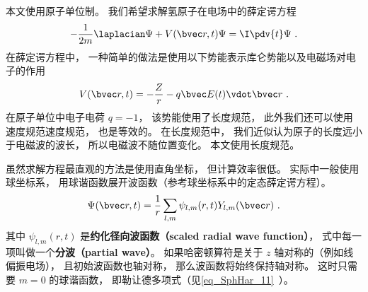 

本文使用原子单位制。 我们希望求解氢原子在电场中的薛定谔方程
\begin{equation}\label{eq_HyTDSE_7}
-\frac{1}{2m}\laplacian \Psi + V(\bvec r, t)\Psi = \I \pdv{t}\Psi~.
\end{equation}
在薛定谔方程中， 一种简单的做法是使用以下势能表示库仑势能以及电磁场对电子的作用
\begin{equation}\label{eq_HyTDSE_8}
V(\bvec r, t) = -\frac{Z}{r} - q\bvec E(t) \vdot \bvec r~.
\end{equation}
在原子单位中电子电荷 $q = -1$， 该势能使用了长度规范， 此外我们还可以使用速度规范速度规范， 也是等效的。 在长度规范中， 我们近似认为原子的长度远小于电磁波的波长， 所以电磁波不随位置变化。 本文使用长度规范。

虽然求解方程最直观的方法是使用直角坐标， 但计算效率很低。 实际中一般使用球坐标系， 用球谐函数展开波函数（参考球坐标系中的定态薛定谔方程）。
\begin{equation}\label{eq_HyTDSE_3}
\Psi(\bvec r, t) = \frac{1}{r}\sum_{l,m} \psi_{l,m}(r, t) Y_{l,m}(\bvec r)~.
\end{equation}
其中 $\psi_{l,m}(r, t)$ 是\textbf{约化径向波函数（scaled radial wave function）}， 式中每一项叫做一个\textbf{分波（partial wave）}。 如果哈密顿算符是关于 $z$ 轴对称的（例如线偏振电场）， 且初始波函数也轴对称， 那么波函数将始终保持轴对称。 这时只需要 $m = 0$ 的球谐函数， 即勒让德多项式（见\autoref{eq_SphHar_11}~）。

